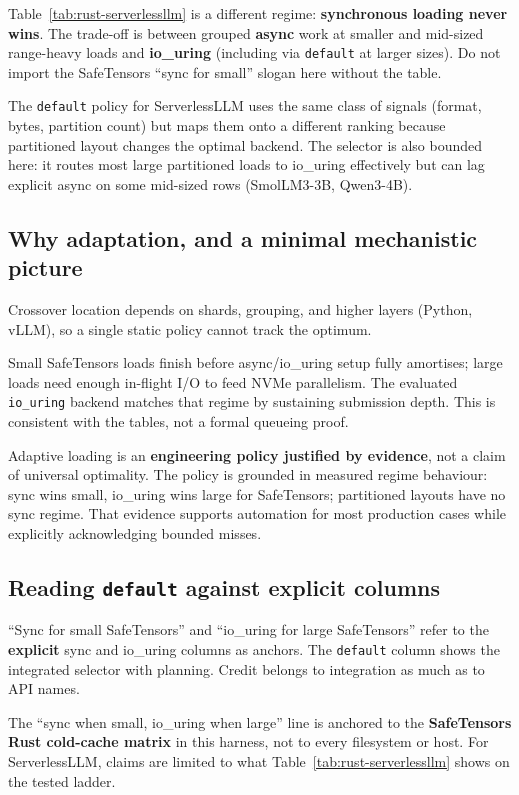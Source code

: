 Table~\ref{tab:rust-serverlessllm} is a different regime: \textbf{synchronous loading never wins}. The trade-off is between grouped \textbf{async} work at smaller and mid-sized range-heavy loads and \textbf{io\_uring} (including via \texttt{default} at larger sizes). Do not import the SafeTensors ``sync for small'' slogan here without the table.

The \texttt{default} policy for ServerlessLLM uses the same class of signals (format, bytes, partition count) but maps them onto a different ranking because partitioned layout changes the optimal backend. The selector is also bounded here: it routes most large partitioned loads to io\_uring effectively but can lag explicit async on some mid-sized rows (SmolLM3-3B, Qwen3-4B).

\subsection{Why adaptation, and a minimal mechanistic picture}

Crossover location depends on shards, grouping, and higher layers (Python, vLLM), so a single static policy cannot track the optimum.

Small SafeTensors loads finish before async/io\_uring setup fully amortises; large loads need enough in-flight I/O to feed NVMe parallelism. The evaluated \texttt{io\_uring} backend matches that regime by sustaining submission depth. This is consistent with the tables, not a formal queueing proof.

Adaptive loading is an \textbf{engineering policy justified by evidence}, not a claim of universal optimality. The policy is grounded in measured regime behaviour: sync wins small, io\_uring wins large for SafeTensors; partitioned layouts have no sync regime. That evidence supports automation for most production cases while explicitly acknowledging bounded misses.

\subsection{Reading \texttt{default} against explicit columns}

``Sync for small SafeTensors'' and ``io\_uring for large SafeTensors'' refer to the \textbf{explicit} sync and io\_uring columns as anchors. The \texttt{default} column shows the integrated selector with planning. Credit belongs to integration as much as to API names.

The ``sync when small, io\_uring when large'' line is anchored to the \textbf{SafeTensors Rust cold-cache matrix} in this harness, not to every filesystem or host. For ServerlessLLM, claims are limited to what Table~\ref{tab:rust-serverlessllm} shows on the tested ladder.
